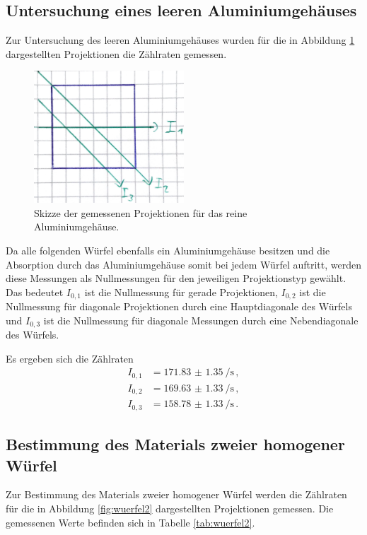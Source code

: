 \subsection{Untersuchung eines leeren Aluminiumgehäuses}

Zur Untersuchung des leeren Aluminiumgehäuses wurden für die in Abbildung \ref{fig:wuerfel1} dargestellten Projektionen die Zählraten gemessen.

\begin{figure}
  \centering
  \includegraphics[width=0.5\textwidth]{images/wuerfel1.jpg}
  \caption{Skizze der gemessenen Projektionen für das reine Aluminiumgehäuse.}
  \label{fig:wuerfel1}
\end{figure}

Da alle folgenden Würfel ebenfalls ein Aluminiumgehäuse besitzen und die Absorption durch das Aluminiumgehäuse somit bei jedem Würfel auftritt, werden
diese Messungen als Nullmessungen für den jeweiligen Projektionstyp gewählt. Das bedeutet $I_{0,1}$ ist die Nullmessung für gerade Projektionen,  $I_{0,2}$ ist die Nullmessung für diagonale Projektionen durch eine Hauptdiagonale des Würfels
und $I_{0,3}$ ist die Nullmessung für diagonale Messungen durch eine Nebendiagonale des Würfels.

Es ergeben sich die Zählraten
\begin{align*}
  I_{0,1}&=\SI{171.83(135)}{\per\second} \,, \\
  I_{0,2}&=\SI{169.63(133)}{\per\second} \,, \\
  I_{0,3}&=\SI{158.78(133)}{\per\second} \,.
\end{align*}

\subsection{Bestimmung des Materials zweier homogener Würfel}
\label{subsec:wuerfel}
Zur Bestimmung des Materials zweier homogener Würfel werden die Zählraten für die
in Abbildung \ref{fig:wuerfel2} dargestellten Projektionen gemessen. Die gemessenen Werte befinden sich in Tabelle \ref{tab:wuerfel2}.

